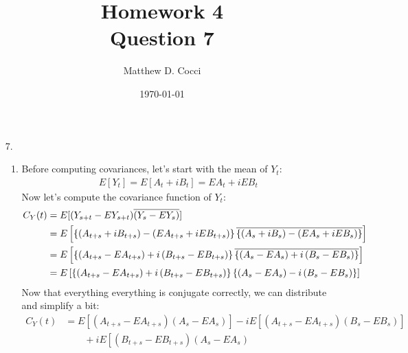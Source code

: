 \documentclass[12pt]{article}
\author{Matthew D. Cocci}
\title{Homework 4 \\ {\normalsize Question 7}}
\date{\today}
\theoremstyle{plain}
\theoremstyle{definition}
\theoremstyle{remark}
\begin{document}
\maketitle


\begin{enumerate}
  \item[7.] %
  \begin{enumerate}
    \item
    Before computing covariances, let's start with the mean of $Y_t$:
    \begin{align*}
      E[Y_t] = E[A_t + iB_t] = EA_t + iEB_t
    \end{align*}
    Now let's compute the covariance function of $Y_t$:
    \begin{align*}
      C_Y(t) &= E[(Y_{s+t}-EY_{s+t})\overline{(Y_s- EY_s)}]\\
      &=
        E\left[
          \left\{
            \left(A_{t+s} + i B_{t+s}\right)
            - \left(EA_{t+s} + i EB_{t+s}\right)
          \right\}
        \overline{%
          \left\{
            \left(A_{s} + i B_{s}\right)
            - \left(EA_{s} + i EB_{s}\right)
          \right\}
        }
        \right]\\
      &=
        E\left[
          \left\{
            \left(A_{t+s} - EA_{t+s}\right)
            + i\left( B_{t+s}- EB_{t+s}\right)
          \right\}
        \overline{%
          \left\{
            \left(A_{s} - EA_{s}\right)
            + i \left( B_{s}- EB_{s}\right)
          \right\}
        }
        \right]\\
      &=
        E\left[
          \left\{
            \left(A_{t+s} - EA_{t+s}\right)
            + i\left( B_{t+s}- EB_{t+s}\right)
          \right\}
          \left\{
            \left(A_{s} - EA_{s}\right)
            - i \left( B_{s}- EB_{s}\right)
          \right\}
        \right]
    \end{align*}
    Now that everything everything is conjugate correctly, we can
    distribute and simplify a bit:
    \begin{align*}
      C_Y(t)
      &=
        E\left[
            \left(A_{t+s} - EA_{t+s}\right)
            \left(A_{s} - EA_{s}\right)
          \right]
        - i E\left[
            \left(A_{t+s} - EA_{t+s}\right)
            \left( B_{s}- EB_{s}\right)
          \right] \\
      &\qquad
        + i E\left[
            \left( B_{t+s}- EB_{t+s}\right)
            \left(A_{s} - EA_{s}\right)

\end{align*}
\end{enumerate}
\end{enumerate}
\end{document}

